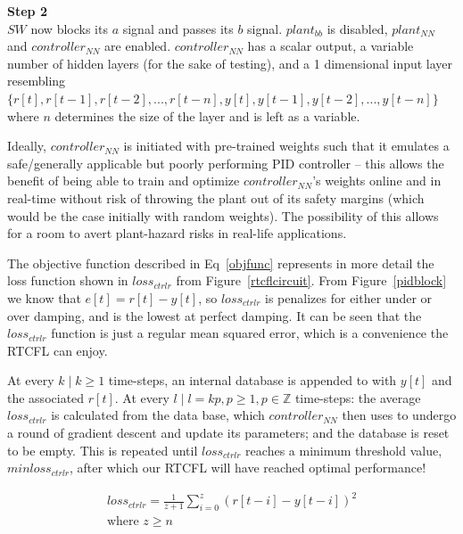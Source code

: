 \documentclass[10pt,twocolumn,letterpaper]{article}
\begin{document}
            \textbf{Step 2}\\
            $SW$ now blocks its $a$ signal and passes its $b$ signal. $plant_{bb}$ is disabled, $plant_{NN}$ and
            $controller_{NN}$ are enabled. $controller_{NN}$ has a scalar output, a variable number of hidden layers
            (for the sake of testing), and a 1 dimensional input layer resembling $\{r[t], r[t-1], r[t-2], ..., r[t-n],
            y[t], y[t-1], y[t-2], ..., y[t-n]\}$ where $n$ determines the size of the layer and is left as a variable.
            
            Ideally, $controller_{NN}$ is initiated with pre-trained weights such that it emulates a safe/generally
            applicable but poorly performing PID controller -- this allows the benefit of being able to train and
            optimize $controller_{NN}$'s weights online and in real-time without risk of throwing the plant out of its
            safety margins (which would be the case initially with random weights). The possibility of this allows for a
            room to avert plant-hazard risks in real-life applications.

            The objective function described in Eq~\ref{objfunc} represents in more detail the loss function shown in
            $loss_{ctrlr}$ from Figure~\ref{rtcflcircuit}. From Figure~\ref{pidblock} we know that $e[t]=r[t]-y[t]$, so
            $loss_{ctrlr}$ is penalizes for either under or over damping, and is the lowest at perfect damping. It can
            be seen that the $loss_{ctrlr}$ function is just a regular mean squared error, which is a convenience the
            RTCFL can enjoy. 
            
            At every $k\;|\;k\geq 1$ time-steps, an internal database is appended to with $y[t]$ and the associated
            $r[t]$. At every $l\;|\;l=kp, p\geq 1, p\in\mathbb{Z}$ time-steps: the average $loss_{ctrlr}$ is calculated
            from the data base, which $controller_{NN}$ then uses to undergo a round of gradient descent and update its
            parameters; and the database is reset to be empty. This is repeated until $loss_{ctrlr}$ reaches a minimum
            threshold value, $minloss_{ctrlr}$, after which our RTCFL will have reached optimal performance!

            \begin{equation} \label{objfunc}
                \begin{gathered}
                    loss_{ctrlr} = \frac{1}{z+1} \sum_{i=0}^z \left(r[t-i]-y[t-i]\right)^2 \\
                    \text{where } z\geq n
                \end{gathered}
            \end{equation}
\end{document}

